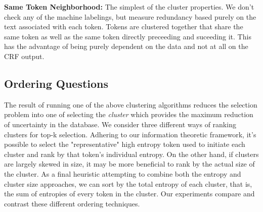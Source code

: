 \textbf{Same Token Neighborhood:} The simplest of the cluster properties.  We don't check any of the machine labelings, but measure redundancy based purely on the text associated with each token.  Tokens are clustered together that share the same token as well as the same token directly preceeding and suceeding it.  This has the advantage of being purely dependent on the data and not at all on the CRF output.


\subsection{Ordering Questions}

The result of running one of the above clustering algorithms reduces the selection problem into one of selecting the \textit{cluster} which provides the maximum reduction of uncertainty in the database.  We consider three different ways of ranking clusters for top-k selection.  Adhering to our information theoretic framework, it's possible to select the "representative" high entropy token used to initiate each cluster and rank by that token's individual entropy.  On the other hand, if clusters are largely skewed in size, it may be more beneficial to rank by the actual size of the cluster.  As a final heuristic attempting to combine both the entropy and cluster size approaches, we can sort by the total entropy of each cluster, that is, the sum of entropies of every token in the cluster.  Our experiments compare and contrast these different ordering techniques. 
